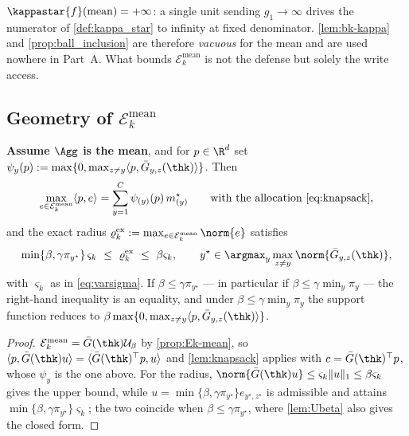 \begin{remark}
\label{rem:mean-not-robust}
$\kappastar{f}(\mathrm{mean})=+\infty$: a single unit sending $g_1\to\infty$ drives the numerator of \cref{def:kappa_star} to infinity at fixed denominator. \cref{lem:bk-kappa} and \cref{prop:ball_inclusion} are therefore \emph{vacuous} for the mean and are used nowhere in Part~A. What bounds $\mathcal{E}_k^{\mathrm{mean}}$ is not the defense but solely the write access.
\end{remark}


\subsection{Geometry of $\mathcal{E}_k^{\mathrm{mean}}$}
\label{sec:geometry}

\begin{lemma}
\label{lem:support}
\textbf{Assume $\Agg$ is the mean}, and for $p\in\R^d$ set
$\psi_y(p):=\max\{0,\max_{z\neq y}\langle p,\bar G_{y,z}(\thk)\rangle\}$. Then
\begin{equation}
\max_{e\in\mathcal{E}_k^{\mathrm{mean}}}\langle p,e\rangle
=\sum_{y=1}^{C}\psi_{(y)}(p)\,m^\star_{(y)}\qquad\text{with the allocation \cref{eq:knapsack}},
\label{eq:support-general}
\end{equation}
and the exact radius $\varrho^{\mathrm{ex}}_k:=\max_{e\in\mathcal{E}_k^{\mathrm{mean}}}\norm{e}$
satisfies
\begin{equation}
\min\{\beta,\gamma\pi_{y^\star}\}\,\varsigma_k\ \le\ \varrho^{\mathrm{ex}}_k\ \le\ \beta\varsigma_k,
\qquad y^\star\in\argmax_y\max_{z\neq y}\norm{\bar G_{y,z}(\thk)} ,
\label{eq:radius-general}
\end{equation}
with $\varsigma_k$ as in \cref{eq:varsigma}. If $\beta\le\gamma\pi_{y^\star}$ --- in particular if
$\beta\le\gamma\min_y\pi_y$ --- the right-hand inequality is an equality, and under
$\beta\le\gamma\min_y\pi_y$ the support function reduces to
$\beta\max\{0,\max_{z\neq y}\langle p,\bar G_{y,z}(\thk)\rangle\}$.
\end{lemma}
\begin{proof}
$\mathcal{E}_k^{\mathrm{mean}}=\bar G(\thk)\mathcal{U}_\beta$ by \cref{prop:Ek-mean}, so
$\langle p,\bar G(\thk)u\rangle=\langle\bar G(\thk)^\top p,u\rangle$ and \cref{lem:knapsack}
applies with $c=\bar G(\thk)^\top p$, whose $\psi_y$ is the one above. For the radius,
$\norm{\bar G(\thk)u}\le\varsigma_k\|u\|_1\le\beta\varsigma_k$ gives the upper bound, while
$u=\min\{\beta,\gamma\pi_{y^\star}\}e_{y^\star,z^\star}$ is admissible and attains
$\min\{\beta,\gamma\pi_{y^\star}\}\varsigma_k$; the two coincide when $\beta\le\gamma\pi_{y^\star}$,
where \cref{lem:Ubeta} also gives the closed form.
\end{proof}

